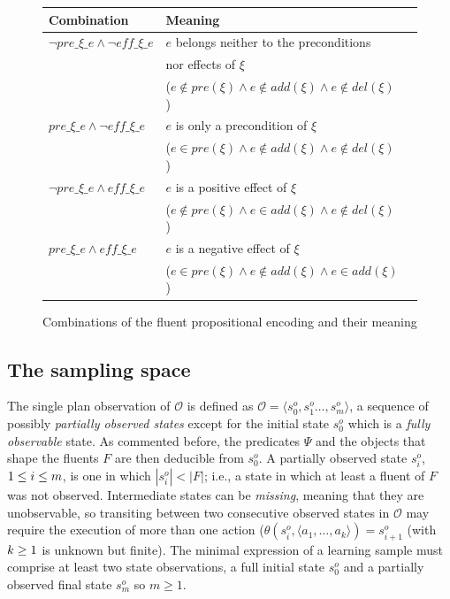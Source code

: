 \documentclass{article}
\newcommand{\tup}[1]{{\langle #1 \rangle}}
\begin{document}
\begin{figure}
	\begin{footnotesize}
		\begin{tabular}{lll}
			{\bf Combination} & {\bf Meaning}\\\hline
			$\neg pre\_\xi\_e \wedge \neg eff\_\xi\_e $& $e$ belongs neither to the preconditions \\
             & nor effects of $\xi$ \\
             & ($e \notin pre(\xi) \wedge e \notin add(\xi) \wedge e \notin del(\xi)$)\\
			$pre\_\xi\_e \wedge \neg eff\_\xi\_e $& $e$ is only a precondition of $\xi$\\
               &  ($e \in pre(\xi) \wedge e \notin add(\xi) \wedge e \notin del(\xi)$) \\
			$\neg pre\_\xi\_e \wedge eff\_\xi\_e $& $e$ is a positive effect of $\xi$ \\
               &  ($e \notin pre(\xi) \wedge e \in add(\xi) \wedge e \notin del(\xi)$) \\
			$pre\_\xi\_e \wedge eff\_\xi\_e  $& $e$ is a negative effect of $\xi$ \\
               &  ($e \in pre(\xi) \wedge e \notin add(\xi) \wedge e \in add(\xi)$) \\
		\end{tabular}
	\end{footnotesize}
	\caption{\small Combinations of the fluent propositional encoding and their meaning}
	\label{fig:combinations}
\end{figure}


\subsection{The sampling space}

The single plan observation of $\mathcal{O}$ is defined as $\mathcal{O}=\tup{s_0^o,s_1^o \ldots, s_m^o}$, a sequence of possibly {\em partially observed states} except for the initial state $s_0^o$ which is a {\em fully observable} state. As commented before, the predicates $\Psi$ and the objects that shape the fluents $F$ are then deducible from $s_0^o$. A partially observed state $s_i^o$, ${\small 1\leq i\leq m}$, is one in which $|s_i^o| < |F|$; i.e., a state in which at least a fluent of $F$ was not observed. Intermediate states can be {\em missing}, meaning that they are unobservable, so transiting between two consecutive observed states in $\mathcal{O}$ may require the execution of more than one action ($\theta(s_i^o,\tup{a_1,\ldots,a_k})=s_{i+1}^o$ (with ${\small k\geq 1}$ is unknown but finite). The minimal expression of a learning sample must comprise at least two state observations, a full initial state $s_0^o$ and a partially observed final state $s_m^o$ so $m \geq 1$.
\end{document}
